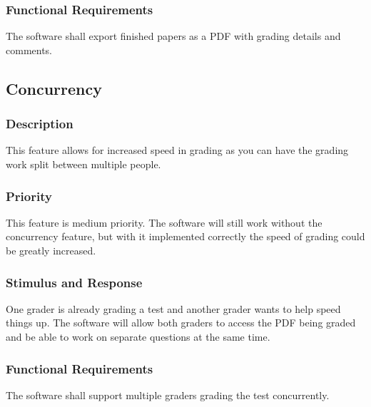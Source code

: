\subsubsection{Functional Requirements}
The software shall export finished papers as a PDF with grading details and comments.


\subsection{Concurrency}
\subsubsection{Description}
This feature allows for increased speed in grading as you can have the grading work split between multiple people.

\subsubsection{Priority}
This feature is medium priority. The software will still work without the concurrency feature, but with it implemented correctly the speed of grading could be greatly increased.

\subsubsection{Stimulus and Response}
One grader is already grading a test and another grader wants to help speed things up. The software will allow both graders to access the PDF being graded and be able to work on separate questions at the same time.

\subsubsection{Functional Requirements}
The software shall support multiple graders grading the test concurrently.

